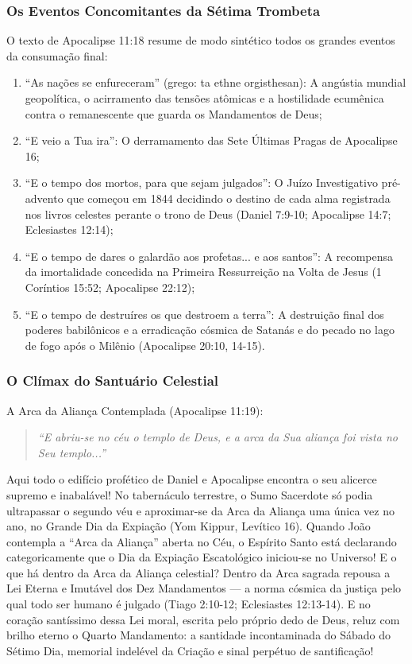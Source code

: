 \subsubsection*{Os Eventos Concomitantes da Sétima Trombeta}
O texto de Apocalipse 11:18 resume de modo sintético todos os grandes eventos da consumação final:
\begin{enumerate}
  \item ``As nações se enfureceram'' (grego: ta ethne orgisthesan): A angústia mundial geopolítica, o acirramento das tensões atômicas e a hostilidade ecumênica contra o remanescente que guarda os Mandamentos de Deus;
  \item ``E veio a Tua ira'': O derramamento das Sete Últimas Pragas de Apocalipse 16;
  \item ``E o tempo dos mortos, para que sejam julgados'': O Juízo Investigativo pré-advento que começou em 1844 decidindo o destino de cada alma registrada nos livros celestes perante o trono de Deus (Daniel 7:9-10; Apocalipse 14:7; Eclesiastes 12:14);
  \item ``E o tempo de dares o galardão aos profetas... e aos santos'': A recompensa da imortalidade concedida na Primeira Ressurreição na Volta de Jesus (1 Coríntios 15:52; Apocalipse 22:12);
  \item ``E o tempo de destruíres os que destroem a terra'': A destruição final dos poderes babilônicos e a erradicação cósmica de Satanás e do pecado no lago de fogo após o Milênio (Apocalipse 20:10, 14-15).
\end{enumerate}



\subsubsection*{O Clímax do Santuário Celestial}
A Arca da Aliança Contemplada (Apocalipse 11:19):

\begin{quote}
\itshape ``E abriu-se no céu o templo de Deus, e a arca da Sua aliança foi vista no Seu templo...''
\end{quote}

Aqui todo o edifício profético de Daniel e Apocalipse encontra o seu alicerce supremo e inabalável!
No tabernáculo terrestre, o Sumo Sacerdote só podia ultrapassar o segundo véu e aproximar-se da Arca da Aliança uma única vez no ano, no Grande Dia da Expiação (Yom Kippur, Levítico 16).
Quando João contempla a ``Arca da Aliança'' aberta no Céu, o Espírito Santo está declarando categoricamente que o Dia da Expiação Escatológico iniciou-se no Universo!
E o que há dentro da Arca da Aliança celestial?
Dentro da Arca sagrada repousa a Lei Eterna e Imutável dos Dez Mandamentos — a norma cósmica da justiça pelo qual todo ser humano é julgado (Tiago 2:10-12; Eclesiastes 12:13-14). E no coração santíssimo dessa Lei moral, escrita pelo próprio dedo de Deus, reluz com brilho eterno o Quarto Mandamento: a santidade incontaminada do Sábado do Sétimo Dia, memorial indelével da Criação e sinal perpétuo de santificação!

